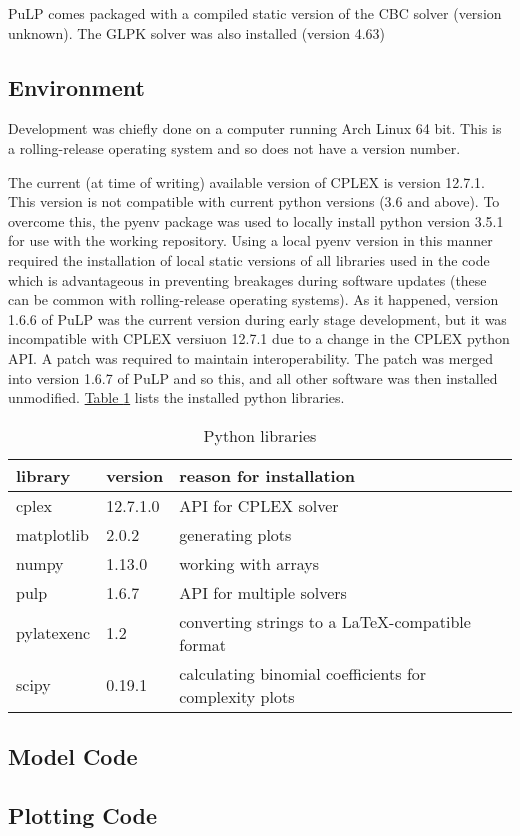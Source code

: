 PuLP comes packaged with a compiled static version of the CBC solver (version
unknown).
The GLPK solver was also installed (version 4.63)

\subsection{Environment}\label{SS.envir}

Development was chiefly done on a computer running Arch Linux 64 bit.
This is a rolling-release operating system and so does not have a version
number.

The current (at time of writing) available version of CPLEX is version 12.7.1.
This version is not compatible with current python versions (3.6 and above).
To overcome this, the pyenv package was used to locally install python version
3.5.1 for use with the working repository.
Using a local pyenv version in this manner required the installation of local
static versions of all libraries used in the code which is advantageous in
preventing breakages during software updates (these can be common with
rolling-release operating systems).
As it happened, version 1.6.6 of PuLP was the current version during early
stage development, but it was incompatible with CPLEX versiuon 12.7.1 due to a
change in the CPLEX python API.  A patch was required to maintain
interoperability.  The patch was merged into version 1.6.7 of PuLP and so this,
and all other software was then installed unmodified.
\hyperref[tbl.libs]{Table \ref*{tbl.libs}} lists the installed python
libraries.




\begin{table}[h!]
    \centering
    \caption{Python libraries}
    \label{tbl.libs}
    \begin{tabular}{l  l  l }
        library & version & reason for installation\\ \hline
        cplex & 12.7.1.0 & API for CPLEX solver \\
        matplotlib & 2.0.2 & generating plots \\
        numpy & 1.13.0 & working with arrays \\
        pulp & 1.6.7 & API for multiple solvers \\
        pylatexenc & 1.2 & converting strings to a \LaTeX-compatible format \\
        scipy & 0.19.1 & calculating binomial coefficients for complexity
            plots \\
    \end{tabular}
\end{table}

\subsection{Model Code}\label{SS.modelcode}

\subsection{Plotting Code}\label{SS.modelcode}



